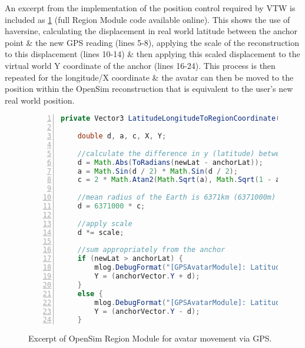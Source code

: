 An excerpt from the implementation of the position control required by VTW is included as \ref{RegionModuleCode1} (full Region Module code available online\RegionModuleCodeFootnote{}). This shows the use of haversine, calculating the displacement in real world latitude between the anchor point \& the new GPS reading (lines 5-8), applying the scale of the reconstruction to this displacement (lines 10-14) \& then applying this scaled displacement to the virtual world Y coordinate of the anchor (lines 16-24). This process is then repeated for the longitude/X coordinate \& the avatar can then be moved to the position within the OpenSim reconstruction that is equivalent to the user's new real world position.

\begin{figure}[h]
\begin{lstlisting}[language=Java, numbers=left, numberstyle=\small, stepnumber=1, frame=single, breaklines=true, backgroundcolor=\color{codebackground}, showstringspaces=false]
private Vector3 LatitudeLongitudeToRegionCoordinate(double newLat, double newLong, double anchorLat, double anchorLong, Vector3 anchorVector, double scale) {

    double d, a, c, X, Y;

    //calculate the difference in y (latitude) between the anchor & the new reading
    d = Math.Abs(ToRadians(newLat - anchorLat));
    a = Math.Sin(d / 2) * Math.Sin(d / 2);
    c = 2 * Math.Atan2(Math.Sqrt(a), Math.Sqrt(1 - a));

    //mean radius of the Earth is 6371km (6371000m)
    d = 6371000 * c;

    //apply scale
    d *= scale;

    //sum appropriately from the anchor
    if (newLat > anchorLat) {
        mlog.DebugFormat("[GPSAvatarModule]: LatitudeLongitudeToRegionCoordinate() - (Y) newLat > anchorLat.");
        Y = (anchorVector.Y + d);
    }
    else {
        mlog.DebugFormat("[GPSAvatarModule]: LatitudeLongitudeToRegionCoordinate() - (Y) newLat < anchorLat.");
        Y = (anchorVector.Y - d);
    }
\end{lstlisting}
\caption{Excerpt of OpenSim Region Module for avatar movement via GPS.}
\label{RegionModuleCode1}
\end{figure}


\clearpage


